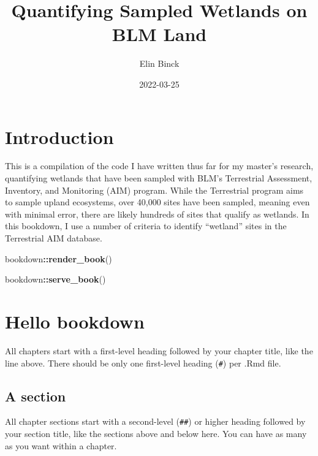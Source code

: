 \documentclass[
]{book}
\title{Quantifying Sampled Wetlands on BLM Land}
\author{Elin Binck}
\date{2022-03-25}
\newenvironment{Shaded}{\begin{snugshade}}{\end{snugshade}}
\newcommand{\KeywordTok}[1]{\textcolor[rgb]{0.13,0.29,0.53}{\textbf{#1}}}
\newcommand{\NormalTok}[1]{#1}
\newcommand{\OperatorTok}[1]{\textcolor[rgb]{0.81,0.36,0.00}{\textbf{#1}}}
\begin{document}
\maketitle

{
\setcounter{tocdepth}{1}
\tableofcontents
}
\hypertarget{introduction}{%
\chapter{Introduction}\label{introduction}}

This is a compilation of the code I have written thus far for my master's research, quantifying wetlands that have been sampled with BLM's Terrestrial Assessment, Inventory, and Monitoring (AIM) program. While the Terrestrial program aims to sample upland ecosystems, over 40,000 sites have been sampled, meaning even with minimal error, there are likely hundreds of sites that qualify as wetlands. In this bookdown, I use a number of criteria to identify ``wetland'' sites in the Terrestrial AIM database.

\begin{Shaded}
\begin{Highlighting}[]
\NormalTok{bookdown}\OperatorTok{::}\KeywordTok{render_book}\NormalTok{()}
\end{Highlighting}
\end{Shaded}

\begin{Shaded}
\begin{Highlighting}[]
\NormalTok{bookdown}\OperatorTok{::}\KeywordTok{serve_book}\NormalTok{()}
\end{Highlighting}
\end{Shaded}

\hypertarget{hello-bookdown}{%
\chapter{Hello bookdown}\label{hello-bookdown}}

All chapters start with a first-level heading followed by your chapter title, like the line above. There should be only one first-level heading (\texttt{\#}) per .Rmd file.

\hypertarget{a-section}{%
\section{A section}\label{a-section}}

All chapter sections start with a second-level (\texttt{\#\#}) or higher heading followed by your section title, like the sections above and below here. You can have as many as you want within a chapter.
\end{document}
